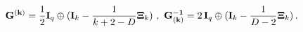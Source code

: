 \begin{equation}
\label{modmetricp} {\bf G^{(k)}}=\frac{1}{2}{\bf I}_q \oplus( {\bf I}_k
-\frac{1}{k+2-D} {\bf\Xi}_k)~,~ {\bf G_{(k)}^{-1}}=2\, {\bf I}_q \oplus( {\bf I}_k - 
\frac{1}{D-2} {\bf\Xi}_k) \, .
\end{equation}

